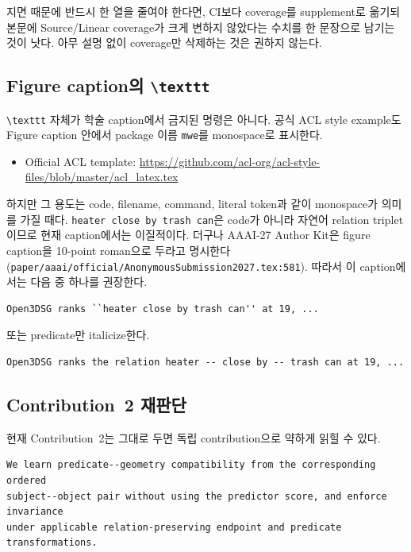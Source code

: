 \documentclass[11pt]{article}
\newcommand{\fileline}[1]{\texttt{#1}}
\begin{document}
지면 때문에 반드시 한 열을 줄여야 한다면, CI보다 coverage를 supplement로 옮기되
본문에 Source/Linear coverage가 크게 변하지 않았다는 수치를 한 문장으로 남기는 것이
낫다. 아무 설명 없이 coverage만 삭제하는 것은 권하지 않는다.

\subsection{Figure caption의 \texttt{\textbackslash texttt}}

\texttt{\textbackslash texttt} 자체가 학술 caption에서 금지된 명령은 아니다.
공식 ACL style example도 Figure caption 안에서 package 이름
\texttt{mwe}를 monospace로 표시한다.

\begin{itemize}[leftmargin=2em]
    \item Official ACL template:
    \url{https://github.com/acl-org/acl-style-files/blob/master/acl_latex.tex}
\end{itemize}

하지만 그 용도는 code, filename, command, literal token과 같이 monospace가 의미를
가질 때다. \texttt{heater close by trash can}은 code가 아니라 자연어 relation
triplet이므로 현재 caption에서는 이질적이다. 더구나 AAAI-27 Author Kit은 figure
caption을 10-point roman으로 두라고 명시한다
(\fileline{paper/aaai/official/AnonymousSubmission2027.tex:581}). 따라서 이
caption에서는 다음 중 하나를 권장한다.

\begin{verbatim}
Open3DSG ranks ``heater close by trash can'' at 19, ...
\end{verbatim}

또는 predicate만 italicize한다.

\begin{verbatim}
Open3DSG ranks the relation heater -- close by -- trash can at 19, ...
\end{verbatim}

\subsection{Contribution~2 재판단}

현재 Contribution~2는 그대로 두면 독립 contribution으로 약하게 읽힐 수 있다.

\begin{verbatim}
We learn predicate--geometry compatibility from the corresponding ordered
subject--object pair without using the predictor score, and enforce invariance
under applicable relation-preserving endpoint and predicate transformations.
\end{verbatim}
\end{document}
